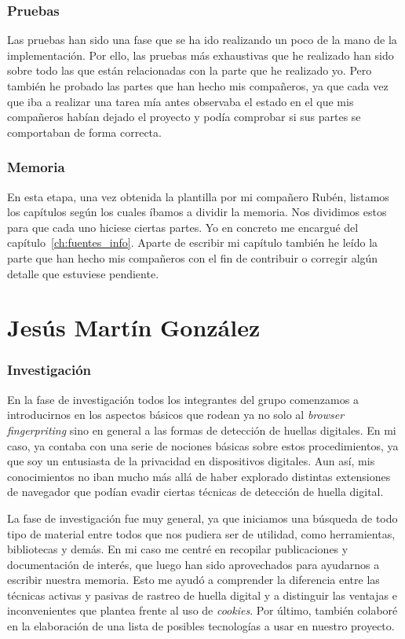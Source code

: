 \subsubsection{Pruebas}
Las pruebas han sido una fase que se ha ido realizando un poco de la mano de la implementación. Por ello, las pruebas más exhaustivas que he realizado han sido sobre todo las que están relacionadas con la parte que he realizado yo. Pero también he probado las partes que han hecho mis compañeros, ya que cada vez que iba a realizar una tarea mía antes observaba el estado en el que mis compañeros habían dejado el proyecto y podía comprobar si sus partes se comportaban de forma correcta.
\subsubsection{Memoria}
En esta etapa, una vez obtenida la plantilla por mi compañero Rubén, listamos los capítulos según los cuales íbamos a dividir la memoria. Nos dividimos estos para que cada uno hiciese ciertas partes. Yo en concreto me encargué del capítulo~\ref{ch:fuentes_info}. Aparte de escribir mi capítulo también he leído la parte que han hecho mis compañeros con el fin de contribuir o corregir algún detalle que estuviese pendiente.


\section{Jesús Martín González}
\subsubsection{Investigación}
En la fase de investigación todos los integrantes del grupo comenzamos a introducirnos en los aspectos básicos que rodean ya no solo al \textit{browser fingerpriting} sino en general a las formas de detección de huellas digitales. En mi caso, ya contaba con una serie de nociones básicas sobre estos procedimientos, ya que soy un entusiasta de la privacidad en dispositivos digitales. Aun así, mis conocimientos no iban mucho más allá de haber explorado distintas extensiones de navegador que podían evadir ciertas técnicas de detección de huella digital. \par

La fase de investigación fue muy general, ya que iniciamos una búsqueda de todo tipo de material entre todos que nos pudiera ser de utilidad, como herramientas, bibliotecas y demás. En mi caso me centré en recopilar publicaciones y documentación de interés, que luego han sido aprovechados para ayudarnos a escribir nuestra memoria. Esto me ayudó a comprender la diferencia entre las técnicas activas y pasivas de rastreo de huella digital y a distinguir las ventajas e inconvenientes que plantea frente al uso de \emph{cookies}. Por último, también colaboré en la elaboración de una lista de posibles tecnologías a usar en nuestro proyecto. \par

